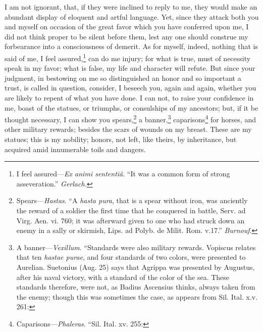 I am not ignorant, that, if they were inclined to reply to me, they
would make an abundant display of eloquent and artful language. Yet,
since they attack both you and myself on occasion of the great favor
which you have conferred upon me, I did not think proper to be silent
before them, lest any one should construe my forbearance into a
consciousness of demerit. As for myself, indeed, nothing that is said
of me, I feel assured,\footnote{I feel assured—\emph{Ex animi sententiâ}. ``It was a common form of strong
asseveration.'' \emph{Gerlach.}} can do me injury; for what is true, must
of necessity speak in my favor; what is false, my life and character
will refute. But since your judgment, in bestowing on me so
distinguished an honor and so important a trust, is called in
question, consider, I beseech you, again and again, whether you are
likely to repent of what you have done. I can not, to raise your
confidence in me, boast of the statues, or triumphs, or consulships of
my ancestors; but, if it be thought necessary, I can show you spears,\footnote{Spears—\emph{Hastas}. ``A \emph{hasta pura}, that is a spear without iron, was
anciently the reward of a soldier the first time that he conquered in
battle, Serv. ad Virg. Aen. vi. 760; it was afterward given to one who had
struck down an enemy in a sally or skirmish, Lips. ad Polyb. de Milit. Rom.
v.17.'' \emph{Burnouf}.}
a banner,\footnote{A banner—\emph{Vexillum}. ``Standards were also military rewards.
Vopiscus relates that ten \emph{hastae purae}, and four standards of two
colors, were presented to Aurelian. Suetonius (Aug. 25) says that Agrippa
was presented by Augustus, after his naval victory, with a standard of the
color of the sea. These standards therefore, were not, as Badius Ascensius
thinks, always taken from the enemy; though this was sometimes the case,
as appears from Sil. Ital. x.v. 261:} caparisons\footnote{Caparisons—\emph{Phaleras}. ``Sil. Ital. xv. 255:} for horses, and other military rewards;
besides the scars of wounds on my breast. These are my statues; this
is my nobility; honors, not left, like theirs, by inheritance, but
acquired amid innumerable toils and dangers.

